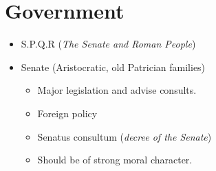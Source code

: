 \documentclass[12pt, twoside]{article}
\begin{document}
\section{Government}
\begin{itemize}
\item S.P.Q.R (\emph{The Senate and Roman People})
\item Senate (Aristocratic, old Patrician families)
	\begin{itemize}
	\item Major legislation and advise consults.
	\item Foreign policy
	\item Senatus consultum (\emph{decree of the Senate})
	\item Should be of strong moral character. 
	\end{itemize}
\end{itemize}
\end{document}
